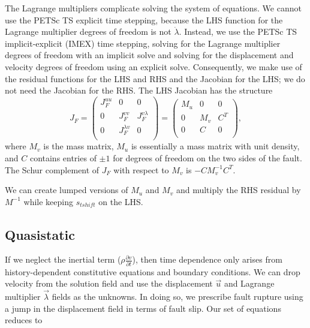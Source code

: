 The Lagrange multipliers complicate solving the system of
equations. We cannot use the PETSc TS explicit time stepping, because
the LHS function for the Lagrange multiplier degrees of freedom is not
$\dot{\lambda}$. Instead, we use the PETSc TS implicit-explicit (IMEX)
time stepping, solving for the Lagrange multiplier degrees of freedom
with an implicit solve and solving for the displacement and velocity
degrees of freedom using an explicit solve. Consequently, we make use
of the residual functions for the LHS and RHS and the Jacobian for the
LHS; we do not need the Jacobian for the RHS. The LHS Jacobian has the
structure
\begin{equation}
J_F = \left(
  \begin{array}{ccc}
    J_F^{uu} & 0 & 0 \\
    0 & J_F^{vv} & J_F^{v \lambda} \\
    0 & J_F^{\lambda v} & 0 \\
  \end{array} \right)
  = \left(
  \begin{array}{ccc}
    M_u & 0 & 0 \\
    0 & M_v & C^T \\
    0 & C & 0 \\
  \end{array} \right),
\end{equation}
where $M_v$ is the mass matrix, $M_u$ is essentially a mass matrix
with unit density, and $C$ contains entries of $\pm 1$ for degrees of
freedom on the two sides of the fault. The Schur complement of $J_F$
with respect to $M_v$ is $-CM_v^{-1}C^T$.

We can create lumped versions of $M_u$ and $M_v$ and multiply the RHS
residual by $M^{-1}$ while keeping $s_\mathit{tshift}$ on the LHS.


\subsection{Quasistatic}

If we neglect the inertial term
($\rho \frac{\partial v}{\partial t}$), then time dependence only
arises from history-dependent constitutive equations and boundary
conditions. We can drop velocity from the solution field and use the
displacement $\vec{u}$ and Lagrange multiplier $\vec{\lambda}$ fields
as the unknowns. In doing so, we prescribe fault rupture using a jump
in the displacement field in terms of fault slip. Our set of equations reduces to

